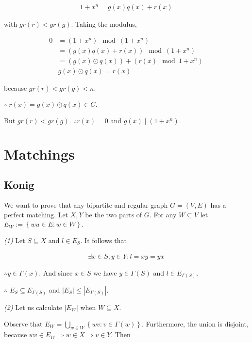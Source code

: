 \documentclass[a4paper]{article}
\begin{document}
\begin{align*}
    1 + x^n = g(x) q(x) + r(x)
\end{align*}

with $gr(r) < gr(g)$. Taking the modulus, 

\begin{align*}
    0 &= (1 + x^n) \mod (1 + x^n) \\ 
      &=\left( g(x) q(x) + r(x) \right) \mod (1 + x^n) \\ 
      &= \left( g(x) \odot q(x) \right)  + \left( r(x) \mod 1 + x^n \right)  \\ 
      & g(x) \odot q(x) = r(x)
\end{align*}

because $gr(r) < gr(g) < n$.

$\therefore ~ r(x) = g(x) \odot  q(x) \in C$.

But $gr(r) < gr(g)$. $\therefore  r(x) = 0$ and $g(x) \mid (1 + x^n)$.



\pagebreak

\section{Matchings}

\subsection{Konig}

We want to prove that any bipartite and regular graph $G = (V, E) $ has a
perfect matching. Let $X, Y$ be the two parts of $G$. For any $W \subseteq V$
let $E_W := \left\{ wu \in E : w \in W \right\} $.

\textit{(1)} Let $S \subseteq X$ and $l \in E_S$. It follows that

\begin{align*}
    \exists x \in S, y \in Y : l = xy = yx 
\end{align*}

$\therefore y \in \Gamma(x)$. And since $x \in  S$ we have $y \in \Gamma(S)$ 
and $l \in E_{\Gamma(S)}$.

$\therefore $ $E_S \subseteq E_{\Gamma(S)}$ and $|E_S| \leq |E_{\Gamma(S)}|$.

\textit{(2)} Let us calculate $|E_W|$ when $W \subseteq X$.

Observe that $E_W = \bigcup_{w \in W} \left\{ wv : v \in \Gamma(w) \right\} $.
Furthermore, the union is disjoint, because $wv \in E_W \Rightarrow w \in X
\Rightarrow v \in Y$. Then
\end{document}
